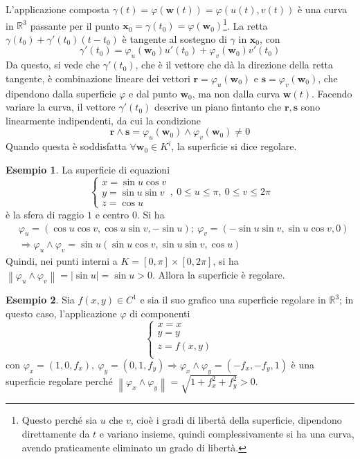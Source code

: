 \documentclass[10pt, a4paper]{scrartcl}
\theoremstyle{definition}
\newtheorem{esempio}{Esempio}
\numberwithin{esempio}{section}
\theoremstyle{definition}
\numberwithin{obs}{section}
\numberwithin{nota}{section}
\numberwithin{equation}{subsection}
\begin{document}
L'applicazione composta $\gamma(t) = \varphi (\mathbf{w} (t)) = \varphi (u(t), v(t))$ \`e una curva in $\mathbb{R}^3$ passante per il punto $\mathbf{x} _0 = \gamma(t_0) = \varphi (\mathbf{w} _0)$\footnote{Questo perch\'e sia $u$ che $v$, cio\`e i gradi di libert\`a della superficie, dipendono direttamente da $t$ e variano insieme, quindi complessivamente si ha una curva, avendo praticamente eliminato un grado di libert\`a.}.
La retta $\gamma(t_0) + \gamma'(t_0) (t-t_0)$ \`e tangente al sostegno di $\gamma$ in $\mathbf{x} _0$, con 
\[
\gamma'(t_0) = \varphi _u(\mathbf{w} _0) u'(t_0) + \varphi _v (\mathbf{w} _0) v'(t_0)
\] 
Da questo, si vede che $\gamma'(t_0)$, che \`e il vettore che d\`a la direzione della retta tangente, \`e combinazione lineare dei vettori $\mathbf{r}  = \varphi _u (\mathbf{w} _0)$ e $\mathbf{s} = \varphi _v(\mathbf{w} _0)$, che dipendono dalla superficie $\varphi $ e dal punto $\mathbf{w} _0$, ma non dalla curva $\mathbf{w} (t)$.
Facendo variare la curva, il vettore $\gamma'(t_0)$ descrive un piano fintanto che $\mathbf{r} ,\mathbf{s} $ sono linearmente indipendenti, da cui la condizione
\begin{equation}
	\mathbf{r} \wedge \mathbf{s} = \varphi _u (\mathbf{w} _0) \wedge \varphi _v(\mathbf{w} _0) \neq 0
\end{equation}
Quando questa \`e soddisfatta $\forall \mathbf{w} _0 \in K^i$, la superficie si dice regolare.
\begin{esempio}\label{sf}
La superficie di equazioni
\[
\begin{cases}
	x = \sin u  \cos v\\
	y = \sin u \sin v \\
	z = \cos u
\end{cases}, \ 0\le u\le \pi,\ 0\le  v \le 2\pi
\] 
\`e la sfera di raggio $1$ e centro $0$. 
Si ha
\[
	\begin{split}
		&\varphi _u = (\cos u \cos v , \cos u \sin v, -\sin u); \ \varphi _v = (-\sin u \sin v , \sin u \cos v , 0 )\\
		&\Rightarrow \varphi _u \wedge \varphi _v = \sin u ( \sin u \cos v, \sin u \sin v, \cos u)
	\end{split}
\] 
Quindi, nei punti interni a $K = \left[ 0,\pi \right] \times \left[ 0,2\pi \right] $, si ha $\left\lVert \varphi _u \wedge \varphi _v \right\rVert = \lvert \sin u \rvert  = \sin u  >0 $. 
Allora la superficie \`e regolare.
\end{esempio}
\begin{esempio}
Sia $f(x,y) \in C^1$ e sia il suo grafico una superficie regolare in $\mathbb{R}^3$; in questo caso, l'applicazione $\varphi $ di componenti 
\[
\begin{cases}
	x = x\\
	y= y \\
	z= f(x,y)\\
\end{cases}	
\] 
con $\varphi _x = (1,0,f_x) , \ \varphi _y = (0,1,f_y) \Rightarrow \varphi _x \wedge \varphi _y = (-f_x, -f_y, 1)$ \`e una superficie regolare perch\'e $\left\lVert \varphi _x \wedge \varphi _y \right\rVert = \sqrt{1+ f_x^2 + f_y^2 } > 0$.

\end{esempio}
\end{document}
